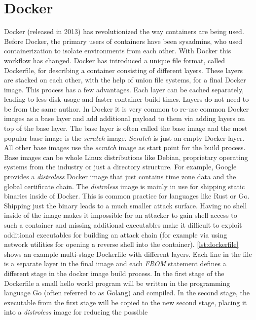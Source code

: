 \documentclass[titlepage]{report}
\begin{document}
\section{Docker}
Docker (released in 2013\cite{DockerRelease}) has revolutionized the way containers are being used.
Before Docker, the primary users of containers have been sysadmins, who used containerization to isolate environments from each other. With Docker
this workflow has changed. Docker has introduced a unique file format, called Dockerfile, for describing a container consisting of different layers. These layers
are stacked on each other, with the help of union file systems, for a final Docker image. This process has a few advantages. Each layer can be cached separately, leading
to less disk usage and faster container build times. Layers do not need to be from the same author. In Docker it is very common to re-use common Docker images
as a base layer and add additional payload to them via adding layers on top of the base layer. The base layer is often called the base image and the most popular
base image is the \emph{scratch} image. \emph{Scratch} is just an empty Docker layer. All other base images use the \emph{scratch} image as start point for the build process.
Base images can be whole Linux distributions like Debian, proprietary operating systems from the industry or just a directory structure. For example, Google provides
a \emph{distroless} Docker image that just contains time zone data and the global certificate chain\cite{Distroless}. The \emph{distroless} image is mainly in use for shipping
static binaries inside of Docker. This is common practice for languages like Rust or Go. Shipping just the binary leads to a much smaller attack surface. Having no shell inside
of the image makes it impossible for an attacker to gain shell access to such a container and missing additional executables make it difficult to
exploit additional executables for building an attack chain (for example via using network utilities for opening a reverse shell into the container).
\autoref{lst:dockerfile} shows an example multi-stage Dockerfile with different layers. Each line in the file is a separate layer in the final image
and each \emph{FROM} statement defines a different stage in the docker image build process. In the first stage of the Dockerfile
a small hello world program will be written in the programming language Go (often referred to as Golang) and compiled. In the second stage,
the executable from the first stage will be copied to the new second stage, placing it into a \emph{distroless} image for reducing the possible
\end{document}
